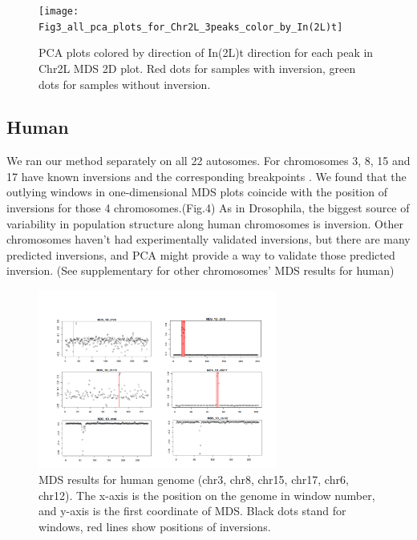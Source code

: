 \documentclass[11pt, oneside]{article}   	%
\begin{document}
\begin{figure}
    \begin{center}
       \texttt{[image: Fig3\_all\_pca\_plots\_for\_Chr2L\_3peaks\_color\_by\_In(2L)t]}
    \end{center}
    \caption{
         PCA plots colored by direction of In(2L)t direction for each peak in Chr2L MDS 2D plot. Red dots for samples with inversion, green dots for samples without inversion.
        \label{fig:pde_clines}
    }
\end{figure}

\subsection{Human}
We ran our method separately on all 22 autosomes. For chromosomes 3, 8, 15 and 17 have known inversions and the corresponding breakpoints \citep{antonacci2009characterization}. We found that the outlying windows in one-dimensional MDS plots coincide with the position of inversions for those 4 chromosomes.(Fig.4) As in Drosophila, the biggest source of variability in population structure along human chromosomes is inversion. Other chromosomes haven't had experimentally validated inversions, but there are many predicted inversions, and PCA might provide a way to validate those predicted inversion. \citep{ma2012investigation} (See supplementary for other chromosomes' MDS results for human)

\begin{figure}
    \begin{center}
       \includegraphics[width=0.7\textwidth]{fig4}
    \end{center}
    \caption{
         MDS results for human genome (chr3, chr8, chr15, chr17, chr6, chr12). The x-axis is the position on the genome in window number, and y-axis is the first coordinate of MDS. Black dots stand for windows, red lines show positions of inversions.
        \label{fig:pde_clines}
    }
\end{figure}
\end{document}
